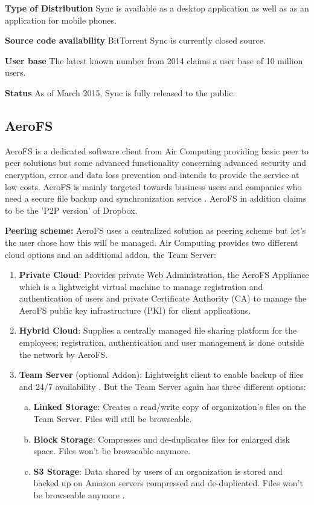 \textbf{Type of Distribution}
Sync is available as a desktop application as well as as an application for mobile phones.

\textbf{Source code availability}
BitTorrent Sync is currently closed source.

\textbf{User base}
The latest known number from 2014 claims a user base of 10 million users.

\textbf{Status}
As of March 2015, Sync is fully released to the public.

\subsection{AeroFS}
AeroFS is a dedicated software client from Air Computing providing basic peer to peer solutions but some advanced functionality concerning advanced security and encryption, error and data loss prevention and intends to provide the service at low costs. AeroFS is mainly targeted towards business users and companies who need a secure file backup and synchronization service \cite{aerofs}. AeroFS in addition claims to be the 'P2P version' of Dropbox.

\textbf{Peering scheme:} AeroFS uses a centralized solution as peering scheme but let's the user chose how this will be managed. Air Computing provides two different cloud options and an additional addon, the Team Server:

\begin{enumerate}
\item \textbf{Private Cloud}: Provides private Web Administration, the AeroFS Appliance which is a lightweight virtual machine to manage registration and authentication of users and private Certificate Authority (CA) to manage the AeroFS public key infrastructure (PKI) for client applications.
\item \textbf{Hybrid Cloud}: Supplies a centrally managed file sharing platform for the employees; registration, authentication and user management is done outside the network by AeroFS.
\item \textbf{Team Server} (optional Addon): Lightweight client to enable backup of files and 24/7 availability \cite{aerofs:cloud_types}. But the Team Server again has three different options:
	\begin{enumerate}[(a)]
	\item \textbf{Linked Storage}: Creates a read/write copy of organization's files on the Team Server. Files will still be browseable.
	\item \textbf{Block Storage}: Compresses and de-duplicates files for enlarged disk space. Files won't be browseable anymore.
	\item \textbf{S3 Storage}: Data shared by users of an organization is stored and backed up on Amazon servers compressed and de-duplicated. Files won't be browseable anymore \cite{aerofs:storage_types}.
	\end{enumerate}
\end{enumerate}

